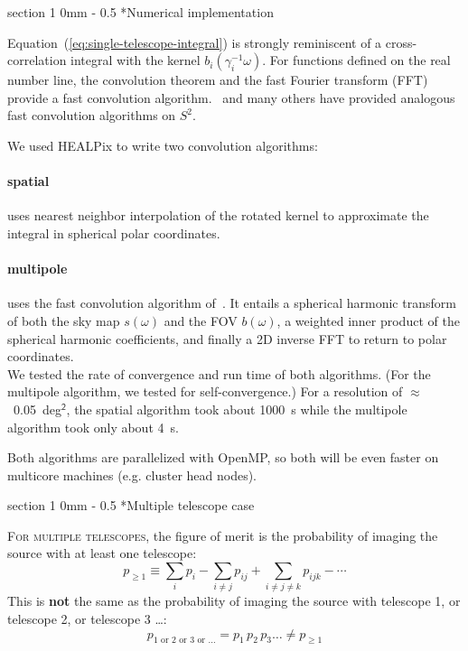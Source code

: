 \documentclass[portrait]{a0poster}
\makeatletter
\renewcommand{\section}{\@startsection
{section}%
{1}%
{0mm}%
{-\baselineskip}%
{0.5\baselineskip}%
{\fontspec{Marvel Bold}\Huge}} %
\makeatother
\begin{document}
\section*{Numerical implementation}

Equation~(\ref{eq:single-telescope-integral}) is strongly reminiscent of a cross-correlation integral with the kernel $b_i (\gamma_i^{-1} \omega)$.  For functions defined on the real number line, the convolution theorem and the fast Fourier transform (FFT) provide a fast convolution algorithm.  \citet{Wandelt:2001p13439}~and many others have provided analogous fast convolution algorithms on $S^2$.

We used HEALPix to write two convolution algorithms:

\paragraph{spatial} uses nearest neighbor interpolation of the rotated kernel to approximate the integral in spherical polar coordinates.

\paragraph{multipole} uses the fast convolution algorithm of~\citet{Wandelt:2001p13439}.  It entails a spherical harmonic transform of both the sky map $s(\omega)$ and the FOV $b(\omega)$, a weighted inner product of the spherical harmonic coefficients, and finally a 2D inverse FFT to return to polar coordinates.\\

We tested the rate of convergence and run time of both algorithms.  (For the multipole algorithm, we tested for self-convergence.)  For a resolution of $\approx$~0.05~deg$^\mathsf{2}$, the spatial algorithm took about 1000~s while the multipole algorithm took only about 4~s.

Both algorithms are parallelized with OpenMP, so both will be even faster on multicore machines (e.g. cluster head nodes).

\section*{Multiple telescope case}

\lettrine{F}{or multiple telescopes}, the figure of merit is the probability of imaging the source with at least one telescope:
$$
	p_{\geqslant 1} \equiv \sum_i p_i - \sum_{i \neq j} p_{ij} + \sum_{i \neq j \neq k} p_{ijk} - \cdots
$$
This is \textbf{not} the same as the probability of imaging the source with telescope 1, or telescope 2, or telescope 3 \dots :
$$
	p_{1 \textrm{ or } 2 \textrm{ or } 3 \textrm{ or } \dots} = p_1 \, p_2 \, p_3 \dots \neq p_{\geqslant 1}
$$
\end{document}
